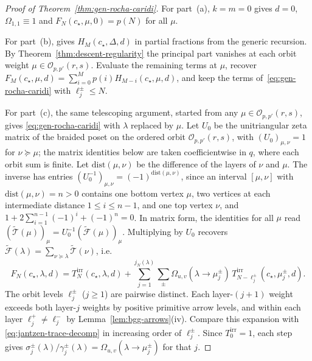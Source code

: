 \documentclass[twoside,10pt]{article}
\numberwithin{equation}{section}
\theoremstyle{slbody}
\theoremstyle{definition}
\theoremstyle{remark}
\begin{document}
\begin{proof}[Proof of Theorem~\ref{thm:gen-rocha-caridi}]
For part~(a), \(k=m=0\) gives \(d=0\), \(\Omega_{1,1}\equiv1\) and
\(F_N(c_\star,\mu,0)=p(N)\) for all \(\mu\).

For part~(b), \cite[Theorem~7.3]{PolzerColliding2026} gives \(H_M(c_\star,\Delta,d)\)
in partial fractions from the generic recursion.  By
Theorem~\ref{thm:descent-regularity} the principal part vanishes at each orbit
weight \(\mu\in\mathcal{O}_{p,p'}(r,s)\).  Evaluate the remaining terms at \(\mu\),
recover \(F_M(c_\star,\mu,d)=\sum_{i=0}^Mp(i)H_{M-i}(c_\star,\mu,d)\), and keep the
terms of~\eqref{eq:gen-rocha-caridi} with \(\ell^\pm_j\leq N\).

For part~(c), the same telescoping argument, started from any
\(\mu\in\mathcal{O}_{p,p'}(r,s)\), gives \eqref{eq:gen-rocha-caridi} with
\(\lambda\) replaced by \(\mu\).  Let \(U_0\) be the unitriangular zeta matrix
of the braided poset on the ordered orbit \(\mathcal{O}_{p,p'}(r,s)\), with
\((U_0)_{\mu,\nu}=1\) for \(\nu\succeq\mu\); the matrix identities below are
taken coefficientwise in \(q\), where each orbit sum is finite.  Let
\(\mathrm{dist}(\mu,\nu)\) be the difference of the layers of \(\nu\) and
\(\mu\).  The inverse has entries
\((U_0^{-1})_{\mu,\nu}=(-1)^{\mathrm{dist}(\mu,\nu)}\), since an interval
\([\mu,\nu]\) with \(\mathrm{dist}(\mu,\nu)=n>0\) contains one bottom vertex
\(\mu\), two vertices at each intermediate distance \(1\leq i\leq n-1\), and
one top vertex \(\nu\), and \(1+2\sum_{i=1}^{n-1}(-1)^i+(-1)^n=0\).  In matrix
form, the identities for all \(\mu\) read
\((\widetilde{\mathcal{T}}(\mu))_\mu=U_0^{-1}(\widetilde{\mathcal{F}}(\mu))_\mu\).
Multiplying by \(U_0\) recovers
\(\widetilde{\mathcal{F}}(\lambda)=\sum_{\nu\succeq\lambda}\widetilde{\mathcal{T}}(\nu)\),
i.e.
\[
 F_N(c_\star,\lambda,d)
 =T^{\mathrm{irr}}_N(c_\star,\lambda,d)
  +\sum_{j=1}^{j_N(\lambda)}\sum_{\pm}
    \Omega_{u,v}(\lambda\to\mu^\pm_j)\,
    T^{\mathrm{irr}}_{N-\ell^\pm_j}(c_\star,\mu^\pm_j,d).
\]
The orbit levels \(\ell^\pm_j\) (\(j\geq1\)) are pairwise distinct.  Each
layer-\((j+1)\) weight exceeds both layer-\(j\) weights by positive primitive
arrow levels, and within each layer \(\ell^+_j\neq\ell^-_j\) by
Lemma~\ref{lem:bgg-arrows}(iv).  Compare this expansion with
\eqref{eq:jantzen-trace-decomp} in increasing order of \(\ell^\pm_j\).  Since
\(T^{\mathrm{irr}}_0=1\), each step gives
\(\sigma^\pm_j(\lambda)/\gamma^\pm_j(\lambda)=\Omega_{u,v}(\lambda\to\mu^\pm_j)\)
for that \(j\).
\end{proof}
\end{document}
